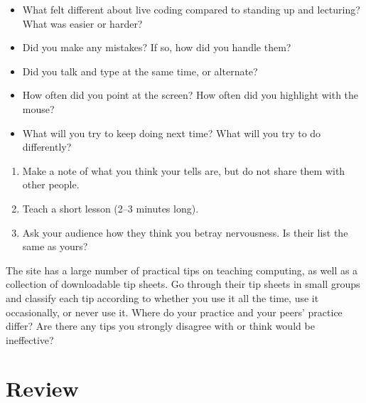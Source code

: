 \begin{itemize}

\item
  What felt different about live coding compared to standing up and lecturing?
  What was easier or harder?

\item
  Did you make any mistakes?
  If so, how did you handle them?

\item
  Did you talk and type at the same time, or alternate?

\item
  How often did you point at the screen?
  How often did you highlight with the mouse?

\item
  What will you try to keep doing next time?
  What will you try to do differently?

\end{itemize}


\begin{enumerate}

\item
  Make a note of what you think your tells are,
  but do not share them with other people.

\item
  Teach a short lesson (2--3 minutes long).

\item
  Ask your audience how they think you betray nervousness.
  Is their list the same as yours?

\end{enumerate}


The  site
has a large number of practical tips on teaching computing,
as well as a collection of downloadable tip sheets.
Go through their tip sheets in small groups and classify each tip
according to whether you use it all the time,
use it occasionally,
or never use it.
Where do your practice and your peers' practice differ?
Are there any tips you strongly disagree with or think would be ineffective?

\section*{Review}

